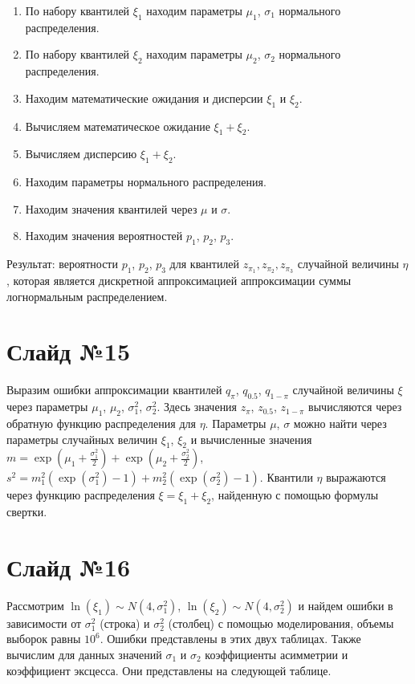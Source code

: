 \documentclass[specialist, substylefile = spbu.rtx,
subf,href,colorlinks=true, 12pt]{disser}
\begin{document}
	\begin{enumerate}
		\item По набору квантилей $\xi_{1}$ находим параметры $\mu_{1}$, $\sigma_{1}$ нормального распределения.
		\item По набору квантилей $\xi_{2}$ находим параметры $\mu_{2}$, $\sigma_{2}$ нормального распределения.
		\item Находим математические ожидания и дисперсии $\xi_{1}$ и $\xi_{2}.$
		\item Вычисляем математическое ожидание $\xi_{1}+\xi_{2}.$
		\item Вычисляем дисперсию $\xi_{1}+\xi_{2}.$
		\item Находим параметры нормального распределения.
		\item Находим значения квантилей через $\mu$ и $\sigma$.
		\item Находим значения вероятностей $p_{1}$, $p_{2}$, $p_{3}$.
	\end{enumerate}
	
Результат: вероятности $p_{1}$, $p_{2}$, $p_{3}$ для квантилей $z_{\pi_{1}}, z_{\pi_{2}}, z_{\pi_{3}}$ случайной величины $\eta$, которая является дискретной аппроксимацией аппроксимации суммы логнормальным распределением.

\section*{Слайд №15}

Выразим ошибки аппроксимации квантилей $q_{\pi}$, $q_{0.5}$, $q_{1-\pi}$ случайной величины $\xi$ через параметры $\mu_{1}$, $\mu_{2}$, $\sigma_{1}^{2}$, $\sigma_{2}^{2}$. Здесь значения $z_{\pi}$, $z_{0.5}$, $z_{1-\pi}$ вычисляются через обратную функцию распределения для $\eta$. Параметры $\mu$, $\sigma$ можно найти через параметры случайных величин $\xi_{1}$, $\xi_{2}$ и вычисленные значения
$m = \exp\left( \mu_{1}+\frac{\sigma_{1}^{2}}{2}\right) + \exp\left( \mu_{2}+\frac{\sigma_{2} ^{2}}{2}\right)$, $s^{2} = m_{1}^{2}(\exp(\sigma_{1}^{2})-1)+m_{2}^{2}(\exp(\sigma_{2}^{2})-1)$. Квантили $\eta$ выражаются через функцию распределения $\xi = \xi_{1}+\xi_{2}$, найденную с помощью формулы свертки.

\section*{Слайд №16}	

Рассмотрим $\ln(\xi_{1}) \sim N(4, \sigma _{1}^{2})$, $\ln(\xi_{2}) \sim N(4, \sigma _{2}^{2})$ и найдем ошибки в зависимости от $\sigma_{1}^{2}$ (строка) и $\sigma_{2}^{2}$ (столбец) с помощью моделирования, объемы выборок равны $10^{6}$. Ошибки представлены в этих двух таблицах. Также вычислим для данных значений $\sigma_{1}$ и $\sigma_{2}$ коэффициенты асимметрии и коэффициент эксцесса. Они представлены на следующей таблице.
\end{document}
